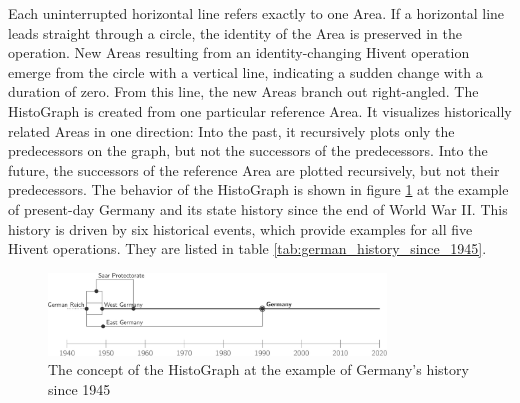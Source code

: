 \vspace{-2.5em}

Each uninterrupted horizontal line refers exactly to one Area. If a horizontal line leads straight through a circle, the identity of the Area is preserved in the operation. New Areas resulting from an identity-changing Hivent operation emerge from the circle with a vertical line, indicating a sudden change with a duration of zero. From this line, the new Areas branch out right-angled. The HistoGraph is created from one particular reference Area. It visualizes historically related Areas in one direction: Into the past, it recursively plots only the predecessors on the graph, but not the successors of the predecessors. Into the future, the successors of the reference Area are plotted recursively, but not their predecessors.
The behavior of the HistoGraph is shown in figure \ref{fig:example_germany} at the example of present-day Germany and its state history since the end of World War II. This history is driven by six historical events, which provide examples for all five Hivent operations. They are listed in table \ref{tab:german_history_since_1945}.

\begin{figure}[ht]
  \vspace{0.5em}
  \centering
  \includegraphics[width=0.8\textwidth]{graphics/development/hivent_model/histograph/example_germany}
  \caption{The concept of the HistoGraph at the example of Germany's history since 1945}
  \label{fig:example_germany}
\end{figure}


